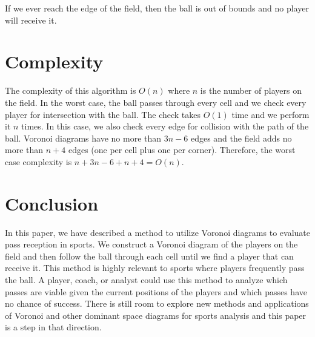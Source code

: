 \documentclass[11pt]{article}
\begin{document}
If we ever reach the edge of the field, then the ball is out of bounds and no player will receive it.

\section*{Complexity}
The complexity of this algorithm is \(O(n)\) where \(n\) is the number of players on the field. In the worst case, the ball passes through every cell and
we check every player for intersection with the ball. The check takes \(O(1)\) time and we perform it \(n\) times. In this case, we also check every edge for collision with
the path of the ball. Voronoi diagrams have no more than \(3n-6\) edges and the field adds no more than \(n + 4\) edges (one per cell plus one per corner).
Therefore, the worst case complexity is \(n + 3n - 6 + n + 4 = O(n)\).

\section*{Conclusion}
In this paper, we have described a method to utilize Voronoi diagrams to evaluate pass reception in sports. We construct a Voronoi diagram of the players on the field and then follow the ball
through each cell until we find a player that can receive it. This method is highly relevant to sports where players frequently pass the ball. A player, coach, or analyst could use this method
to analyze which passes are viable given the current positions of the players and which passes have no chance of success. There is still room to explore new methods and applications
of Voronoi and other dominant space diagrams for sports analysis and this paper is a step in that direction.
\end{document}
